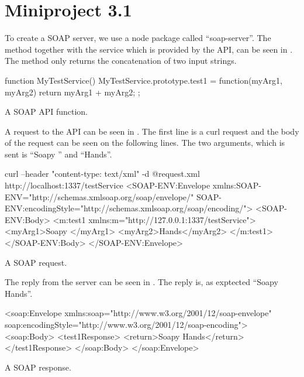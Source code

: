 \chapter{Miniproject 3.1}
To create a SOAP server, we use a node package called ``soap-server''.
The method together with the service which is provided by the API, can be seen in .
The method only returns the concatenation of two input strings.

\begin{listing}
    \begin{js}
        function MyTestService(){
        }
        MyTestService.prototype.test1 = function(myArg1, myArg2){
            return myArg1 + myArg2;
        };
    \end{js}
    \caption{A SOAP API function.}
    \label{lst:soap_func}
\end{listing}

A request to the API can be seen in .
The first line is a curl request and the body of the request can be seen on the following lines. 
The two arguments, which is sent is ``Soapy '' and ``Hands''.

\begin{listing}
    \begin{xmlblock}
        curl --header "content-type: text/xml" -d @request.xml http://localhost:1337/testService
        <SOAP-ENV:Envelope
          xmlns:SOAP-ENV="http://schemas.xmlsoap.org/soap/envelope/"
          SOAP-ENV:encodingStyle="http://schemas.xmlsoap.org/soap/encoding/">
          <SOAP-ENV:Body>
            <m:test1 xmlns:m="http://127.0.0.1:1337/testService">
              <myArg1>Soapy </myArg1>
              <myArg2>Hands</myArg2>
            </m:test1>
          </SOAP-ENV:Body>
        </SOAP-ENV:Envelope>
    \end{xmlblock}
    \caption{A SOAP request.}
    \label{lst:soap_req}
\end{listing}

The reply from the server can be seen in .
The reply is, as exptected ``Soapy Hands''.

\begin{listing}
    \begin{xmlblock}
        <soap:Envelope
                xmlns:soap="http://www.w3.org/2001/12/soap-envelope"
                soap:encodingStyle="http://www.w3.org/2001/12/soap-encoding">
                <soap:Body>
                        <test1Response>
                                <return>Soapy Hands</return>
                        </test1Response>
                </soap:Body>
        </soap:Envelope>
    \end{xmlblock}
    \caption{A SOAP response.}
    \label{lst:soap_respond}
\end{listing}